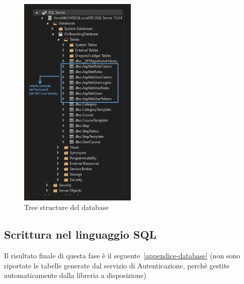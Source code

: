 \begin{figure}[ht]
	\centering
	\includegraphics[width=0.5\textwidth]{img/TreeStructureDatabase.png}
	\caption{Tree structure del database}
	\label{fig:two}
\end{figure}
%
\subsection{Scrittura nel linguaggio SQL}
Il risultato finale di questa fase è il seguente~\ref{appendice-database} (non sono riportate le tabelle
generate dal servizio di Autenticazione, perchè gestite automaticamente dalla
libreria a disposizione)
%
